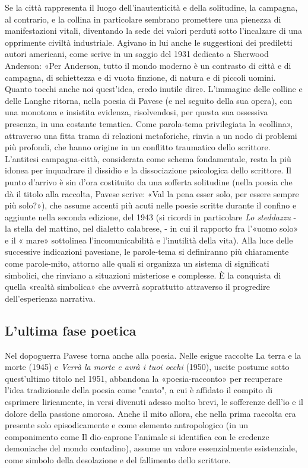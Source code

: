 Se la città rappresenta il luogo dell'inautenticità e della solitudine, la campagna, al contrario, e la collina in particolare sembrano promettere una pienezza di manifestazioni vitali, diventando la sede dei valori perduti sotto l'incalzare di una opprimente civiltà industriale. Agivano in lui anche le suggestioni dei prediletti autori americani, come scrive in un saggio del 1931 dedicato a Sherwood Anderson: «Per Anderson, tutto il mondo moderno è un contrasto di città e di campagna, di schiettezza e di vuota finzione, di natura e di piccoli uomini. Quanto tocchi anche noi quest'idea, credo inutile dire». L'immagine delle colline e delle Langhe ritorna, nella poesia di Pavese (e nel seguito della sua opera), con una monotona e insistita evidenza, risolvendosi, per questa sua ossessiva presenza, in una costante tematica. Come parola-tema privilegiata la «collina», attraverso una fitta trama di relazioni metaforiche, rinvia a un nodo di problemi più profondi, che hanno origine in un conflitto traumatico dello scrittore. L'antitesi campagna-città, considerata come schema fondamentale, resta la più idonea per inquadrare il dissidio e la dissociazione psicologica dello scrittore. Il punto d'arrivo è sin d'ora costituito da una sofferta solitudine (nella poesia che dà il titolo alla raccolta, Pavese scrive: «Val la pena esser solo, per essere sempre più solo?»), che assume accenti più acuti nelle poesie scritte durante il confino e aggiunte nella seconda edizione, del 1943 (si ricordi in particolare \textit{Lo steddazzu} - la stella del mattino, nel dialetto calabrese, - in cui il rapporto fra l'«uomo solo» e il « mare» sottolinea l'incomunicabilità e l'inutilità della vita). Alla luce delle successive indicazioni pavesiane, le parole-tema si definiranno più chiaramente come parole-mito, attorno alle quali si organizza un sistema di significati simbolici, che rinviano a situazioni misteriose e complesse. È la conquista di quella «realtà simbolica» che avverrà soprattutto attraverso il progredire dell'esperienza narrativa.

\subsection{L'ultima fase poetica}

Nel dopoguerra Pavese torna anche alla poesia. Nelle esigue raccolte La terra e la morte (1945) e \textit{Verrà la morte e avrà i tuoi occhi} (1950), uscite postume sotto quest'ultimo titolo nel 1951, abbandona la «poesia-racconto» per recuperare l'idea tradizionale della poesia come "canto", a cui è affidato il compito di esprimere liricamente, in versi divenuti adesso molto brevi, le sofferenze dell'io e il dolore della passione amorosa. Anche il mito allora, che nella prima raccolta era presente solo episodicamente e come elemento antropologico (in un componimento come Il dio-caprone l'animale si identifica con le credenze demoniache del mondo contadino), assume un valore essenzialmente esistenziale, come simbolo della desolazione e del fallimento dello scrittore.

